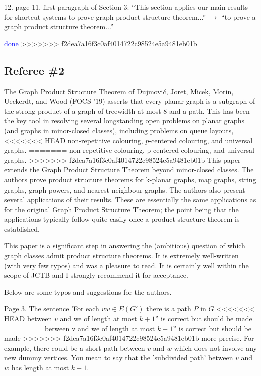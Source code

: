 \documentclass[12pt]{article}
\begin{document}
12. page 11, first paragraph of Section 3: “This section applies our main results for shortcut systems to prove graph product structure theorem...” $\longrightarrow$ “to prove a graph product structure theorem...”

\textcolor{blue}{done}
>>>>>>> f2dea7a16f3c0af4014722c98524e5a9481eb01b

\subsection*{Referee \#2}

The Graph Product Structure Theorem of Dujmović, Joret,
Micek, Morin, Ueckerdt, and Wood (FOCS '19) asserts that every planar
graph is a subgraph of the strong product of a graph of treewidth at
most 8 and a path.  This has been the key tool in resolving several
longstanding open problems on planar graphs (and graphs in
minor-closed classes), including problems on queue layouts,
<<<<<<< HEAD
non-repetitive colouring, $p$-centered colouring, and universal graphs.
=======
non-repetitive colouring, p-centered colouring, and universal graphs.
>>>>>>> f2dea7a16f3c0af4014722c98524e5a9481eb01b
This paper extends the Graph Product Structure Theorem beyond
minor-closed classes.  The authors prove product structure theorems
for k-planar graphs, map graphs, string graphs, graph powers, and
nearest neighbour graphs.   The authors also present several
applications of their results.  These are essentially the same
applications as for the original Graph Product Structure Theorem; the
point being that the applications typically follow quite easily once a
product structure theorem is established.

This paper is a significant step in answering the (ambitious) question
of which graph classes admit product structure theorems. It is
extremely well-written (with very few typos) and was a pleasure to
read.  It is certainly well within the scope of JCTB and I strongly
recommend it for acceptance.

Below are some typos and suggestions for the authors.

Page 3.  The sentence 'For each $vw \in E(G')$ there is a path $P$ in $G$
<<<<<<< HEAD
between $v$ and we of length at most $k+1$'' is correct but should be made
=======
between v and we of length at most $k+1$'' is correct but should be made
>>>>>>> f2dea7a16f3c0af4014722c98524e5a9481eb01b
more precise.  For example, there could be a short path between $v$ and
$w$ which does not involve any new dummy vertices.  You mean to say that
the 'subdivided path' between $v$ and $w$ has length at most $k+1$.
\end{document}
